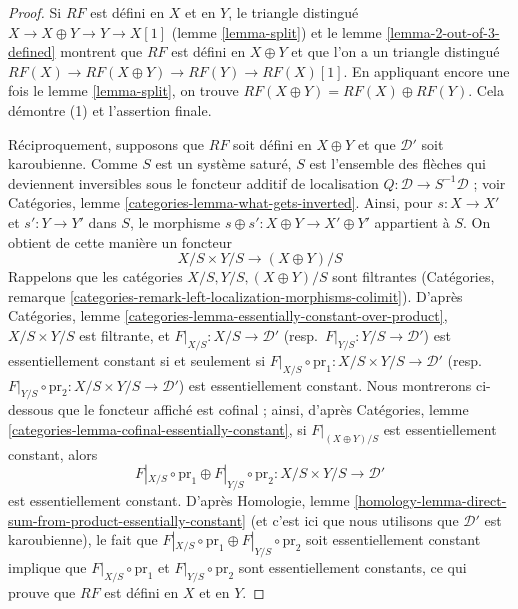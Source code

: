 \begin{proof}
Si $RF$ est défini en $X$ et en $Y$, le triangle distingué
$X \to X \oplus Y \to Y \to X[1]$ (lemme \ref{lemma-split}) et le
lemme \ref{lemma-2-out-of-3-defined} montrent que $RF$ est défini en
$X \oplus Y$ et que l'on a un triangle distingué
$RF(X) \to RF(X \oplus Y) \to RF(Y) \to RF(X)[1]$. En appliquant encore une
fois le lemme \ref{lemma-split}, on trouve
$RF(X \oplus Y) = RF(X) \oplus RF(Y)$. Cela démontre (1) et l'assertion
finale.

\medskip\noindent
Réciproquement, supposons que $RF$ soit défini en $X \oplus Y$ et que
$\mathcal{D}'$ soit karoubienne. Comme $S$ est un système saturé, $S$ est
l'ensemble des flèches qui deviennent inversibles sous le foncteur additif de
localisation $Q : \mathcal{D} \to S^{-1}\mathcal{D}$ ; voir Catégories, lemme
\ref{categories-lemma-what-gets-inverted}. Ainsi, pour
$s : X \to X'$ et $s' : Y \to Y'$ dans $S$, le morphisme
$s \oplus s' : X \oplus Y \to X' \oplus Y'$ appartient à $S$. On obtient de
cette manière un foncteur
$$
X/S \times Y/S \longrightarrow (X \oplus Y)/S
$$
Rappelons que les catégories $X/S, Y/S, (X \oplus Y)/S$ sont filtrantes
(Catégories, remarque
\ref{categories-remark-left-localization-morphisms-colimit}). D'après
Catégories, lemme \ref{categories-lemma-essentially-constant-over-product},
$X/S \times Y/S$ est filtrante, et
$F|_{X/S} : X/S \to \mathcal{D}'$ (resp.\
$F|_{Y/S} : Y/S \to \mathcal{D}'$) est essentiellement constant si et
seulement si
$F|_{X/S} \circ \text{pr}_1 : X/S \times Y/S \to \mathcal{D}'$ (resp.\
$F|_{Y/S} \circ \text{pr}_2 : X/S \times Y/S \to \mathcal{D}'$) est
essentiellement constant. Nous montrerons ci-dessous que le foncteur affiché
est cofinal ; ainsi, d'après Catégories, lemme
\ref{categories-lemma-cofinal-essentially-constant}, si
$F|_{(X \oplus Y)/S}$ est essentiellement constant, alors
$$
F|_{X/S} \circ \text{pr}_1 \oplus F|_{Y/S} \circ \text{pr}_2 :
X/S \times Y/S \to \mathcal{D}'
$$
est essentiellement constant. D'après Homologie, lemme
\ref{homology-lemma-direct-sum-from-product-essentially-constant}
(et c'est ici que nous utilisons que $\mathcal{D}'$ est karoubienne), le fait
que
$F|_{X/S} \circ \text{pr}_1 \oplus F|_{Y/S} \circ \text{pr}_2$ soit
essentiellement constant implique que
$F|_{X/S} \circ \text{pr}_1$ et $F|_{Y/S} \circ \text{pr}_2$ sont
essentiellement constants, ce qui prouve que $RF$ est défini en $X$ et en $Y$.


\end{proof}
